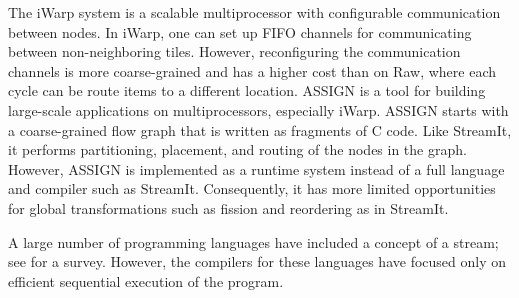 The iWarp system \cite{iwarp} is a scalable multiprocessor with
configurable communication between nodes.  In iWarp, one can set up
FIFO channels for communicating between non-neighboring tiles.
However, reconfiguring the communication channels is more
coarse-grained and has a higher cost than on Raw, where each cycle can
be route items to a different location.  ASSIGN \cite{assign} is a
tool for building large-scale applications on multiprocessors,
especially iWarp.  ASSIGN starts with a coarse-grained flow graph that
is written as fragments of C code.  Like StreamIt, it performs
partitioning, placement, and routing of the nodes in the graph.
However, ASSIGN is implemented as a runtime system instead of a full
language and compiler such as StreamIt.  Consequently, it has more
limited opportunities for global transformations such as fission and
reordering as in StreamIt.

A large number of programming languages have included a concept of a
stream; see \cite{survey97} for a survey. However, the compilers for
these languages have focused only on efficient sequential execution of
the program.
